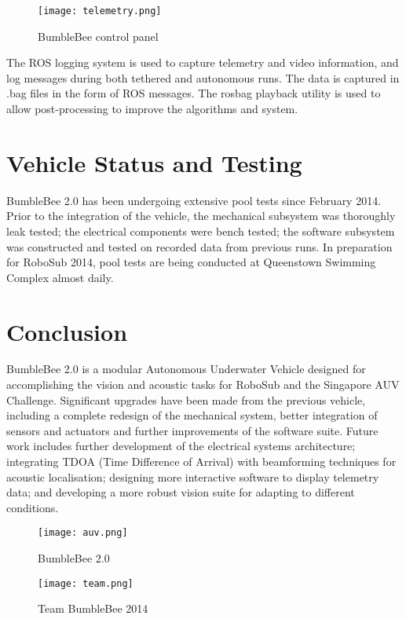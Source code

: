 \documentclass[journal,12pt]{IEEEtran}
\begin{document}
\begin{figure}[h]
\centering
\texttt{[image: telemetry.png]}
\caption{BumbleBee control panel}
\captionsetup{justification=centering}
\end{figure}

The ROS logging system is used to capture telemetry and video information, and log messages during both tethered and autonomous runs. The data is captured in .bag files in the form of ROS messages. The rosbag playback utility is used to allow post-processing to improve the algorithms and system.

\section{Vehicle Status and Testing}
BumbleBee 2.0 has been undergoing extensive pool tests since February 2014. Prior to the integration of the vehicle, the mechanical subsystem was thoroughly leak tested; the electrical components were bench tested; the software subsystem was constructed and tested on recorded data from previous runs. In preparation for RoboSub 2014, pool tests are being conducted at Queenstown Swimming Complex almost daily.

\section{Conclusion}
BumbleBee 2.0 is a modular Autonomous Underwater Vehicle designed for accomplishing the vision and acoustic tasks for RoboSub and the Singapore AUV Challenge. Significant upgrades have been made from the previous vehicle, including a complete redesign of the mechanical system, better integration of sensors and actuators and further improvements of the software suite. Future work includes further development of the electrical systems architecture; integrating TDOA (Time Difference of Arrival) with beamforming techniques for acoustic localisation; designing more interactive software to display telemetry data; and developing a more robust vision suite for adapting to different conditions. \\

\begin{figure}[h]
\centering
\texttt{[image: auv.png]}
\caption{BumbleBee 2.0}
\captionsetup{justification=centering}
\end{figure}

\begin{figure}[h]
\centering
\texttt{[image: team.png]}
\caption{Team BumbleBee 2014}
\captionsetup{justification=centering}
\end{figure}
\end{document}
